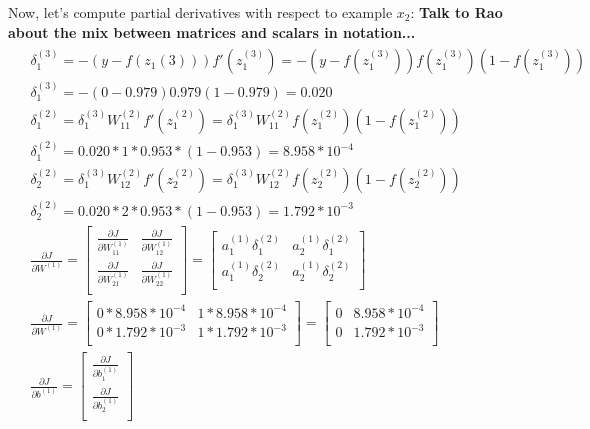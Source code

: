 \documentclass[leqno]{article}
\begin{document}
Now, let's compute partial derivatives with respect to example $x_2$:
\textbf{Talk to Rao about the mix between matrices and scalars in notation...}
\begin{gather*}
\begin{split}
&\delta_1^{(3)} = -(y - f(z_1{(3)}))f'(z_1^{(3)}) = -(y - f(z_1^{(3)}))f(z_1^{(3)})(1 - f(z_1^{(3)}))\\
&\delta_1^{(3)} = -(0 - 0.979)0.979(1 - 0.979) = 0.020\\
&\delta_1^{(2)} = \delta_1^{(3)}W_{11}^{(2)}f'(z_1^{(2)}) = \delta_1^{(3)}W_{11}^{(2)}f(z_1^{(2)})(1 - f(z_1^{(2)}))\\
&\delta_1^{(2)} = 0.020*1*0.953*(1 - 0.953) = 8.958*10^{-4}\\
&\delta_2^{(2)} = \delta_1^{(3)}W_{12}^{(2)}f'(z_2^{(2)}) = \delta_1^{(3)}W_{12}^{(2)}f(z_2^{(2)})(1 - f(z_2^{(2)}))\\
&\delta_2^{(2)} = 0.020 * 2 * 0.953*(1- 0.953) = 1.792*10^{-3}\\
&\frac{\partial J}{\partial W^{(1)}} = 
 \begin{bmatrix}
   \frac{\partial J}{\partial W_{11}^{(1)}} & \frac{\partial J}{\partial W_{12}^{(1)}}\\ 
  \frac{\partial J}{\partial W_{21}^{(1)}} & \frac{\partial J}{\partial W_{22}^{(1)}}\\
  \end{bmatrix}
   =
 \begin{bmatrix}
   a_1^{(1)}\delta_1^{(2)} & a_2^{(1)}\delta_1^{(2)}\\ 
   a_1^{(1)}\delta_2^{(2)} & a_2^{(1)}\delta_2^{(2)}\\
  \end{bmatrix}\\
& \frac{\partial J}{\partial W^{(1)}} =
  \begin{bmatrix}
   0*8.958*10^{-4} & 1*8.958*10^{-4}\\ 
   0*1.792*10^{-3} & 1*1.792*10^{-3}\\
  \end{bmatrix}
 =
  \begin{bmatrix}
   0 & 8.958*10^{-4}\\ 
   0 & 1.792*10^{-3}\\
  \end{bmatrix}
\\
&\frac{\partial J}{\partial b^{(1)}} = 
 \begin{bmatrix}
   \frac{\partial J}{\partial b_1^{(1)}}\\ 
  \frac{\partial J}{\partial b_2^{(1)}}\\

\end{bmatrix}
\end{split}
\end{gather*}
\end{document}
